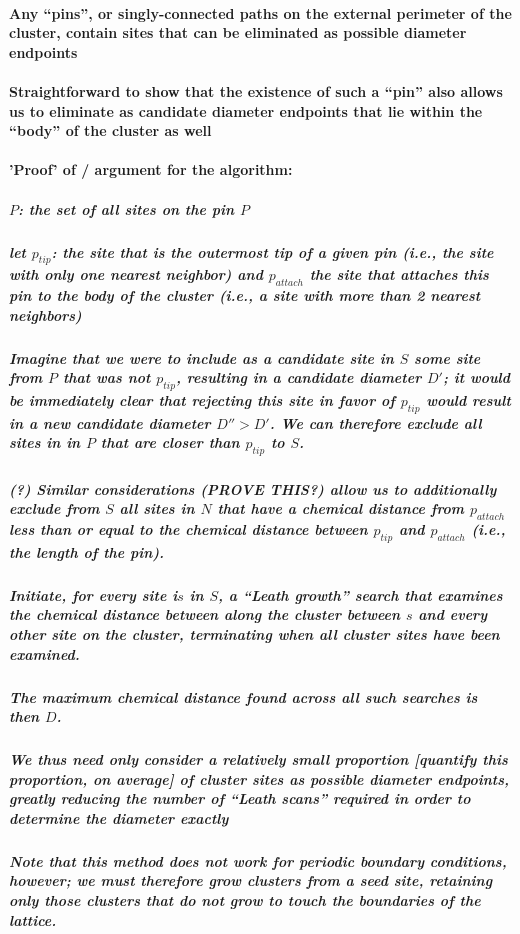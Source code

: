 \documentclass[pre,preprint]{revtex4-1}
\begin{document}
\paragraph{Any ``pins'', or singly-connected paths on the external perimeter of the cluster, contain sites that can be eliminated as possible diameter endpoints}
\label{sec-1.2.4.3}
\paragraph{Straightforward to show that the existence of such a ``pin'' also allows us to eliminate as candidate diameter endpoints that lie within the ``body'' of the cluster as well}
\label{sec-1.2.4.4}
\paragraph{'Proof' of / argument for the algorithm:}
\label{sec-1.2.4.5}
\subparagraph{$P$: the set of all sites on the pin $P$}
\label{sec-1.2.4.5.1}
\subparagraph{let $p_{tip}$: the site that is the outermost tip of a given pin (i.e., the site with only one nearest neighbor) and $p_{attach}$ the site that attaches this pin to the body of the cluster (i.e., a site with more than 2 nearest neighbors)}
\label{sec-1.2.4.5.2}
\subparagraph{Imagine that we were to include as a candidate site in $S$ some site from $P$ that was not $p_{tip}$, resulting in a candidate diameter $D'$; it would be immediately clear that rejecting this site in favor of $p_{tip}$ would result in a new candidate diameter $D''>D'$.  We can therefore exclude all sites in in $P$ that are closer than $p_{tip}$ to $S$.}
\label{sec-1.2.4.5.3}
\subparagraph{(?) Similar considerations (PROVE THIS?) allow us to additionally exclude from $S$ all sites in $N$ that have a chemical distance from $p_{attach}$ less than or equal to the chemical distance between $p_{tip}$ and $p_{attach}$ (i.e., the length of the pin).}
\label{sec-1.2.4.5.4}
\subparagraph{Initiate, for every site i$s$ in $S$, a ``Leath growth'' search that examines the chemical distance between along the cluster between $s$ and every other site on the cluster, terminating when all cluster sites have been examined.}
\label{sec-1.2.4.5.5}
\subparagraph{The maximum chemical distance found across all such searches is then $D$.}
\label{sec-1.2.4.5.6}
\subparagraph{We thus need only consider a relatively small proportion [quantify this proportion, on average] of cluster sites as possible diameter endpoints, greatly reducing the number of ``Leath scans'' required in order to determine the diameter exactly}
\label{sec-1.2.4.5.7}
\subparagraph{Note that this method does not work for periodic boundary conditions, however; we must therefore grow clusters from a seed site, retaining only those clusters that do not grow to touch the boundaries of the lattice.}
\label{sec-1.2.4.5.8}
\end{document}
